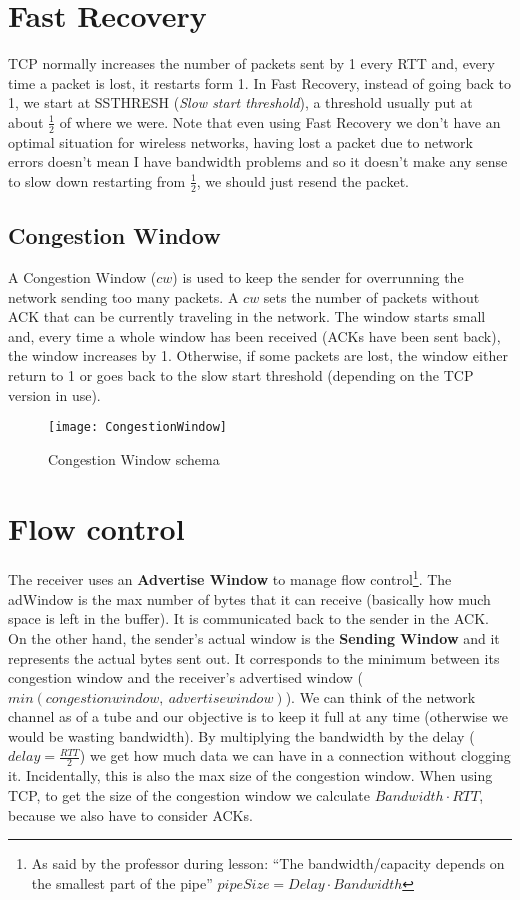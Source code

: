 \section{Fast Recovery}

TCP normally increases the number of 
packets sent by 1 every RTT and, every time a packet is lost, it restarts form
1. In Fast Recovery, instead of going back to 1, we start at SSTHRESH
(\textit{Slow start threshold}), a threshold usually put at about $\frac{1}{2}$
of where we were. Note that even using Fast Recovery we don't have an optimal
situation for wireless networks, having lost a packet due to network errors
doesn't mean I have bandwidth problems and so it doesn't make any sense to slow
down restarting from $\frac{1}{2}$, we should just resend the packet.

\subsection{Congestion Window}
A Congestion Window ($cw$) is used to keep the sender for overrunning the
network sending too many packets. A $cw$ sets the number of packets without ACK
that can be currently traveling in the network. The window starts small and,
every time a whole window has been received (ACKs have been sent back), the
window increases by 1. Otherwise, if some packets are lost, the window either
return to 1 or goes back to the slow start threshold (depending on the TCP
version in use).
\begin{figure}[h]
  \centering
  \texttt{[image: CongestionWindow]}
  \caption{Congestion Window schema}
  \label{fig:tcp:cwschema}
\end{figure}

\section{Flow control}

The receiver uses an \textbf{Advertise Window} to manage flow control\footnote{
  As said by the professor during lesson: ``The bandwidth/capacity depends on
  the smallest part of the pipe'' $pipeSize = Delay \cdot Bandwidth$
}. The adWindow is the max number of bytes that it can receive (basically how
much space is left in the buffer). It is communicated back to the sender in the
ACK. 
On the other hand, the sender's actual window is the \textbf{Sending Window} and 
it represents the actual bytes sent out. It corresponds to the minimum between 
its congestion window and the receiver's advertised window
($min(congestion window,\ advertise window)$). 
We can think of the network channel as of a tube and our objective is to 
keep it full at any time (otherwise we would be wasting bandwidth). By
multiplying the bandwidth by the delay ($delay = \frac{RTT}{2}$) we get how much
data we can have in a connection without clogging it. Incidentally, this is also
the max size of the congestion window. When using TCP, to get the size of the
congestion window we calculate $Bandwidth \cdot RTT$, because we also have to
consider ACKs.


